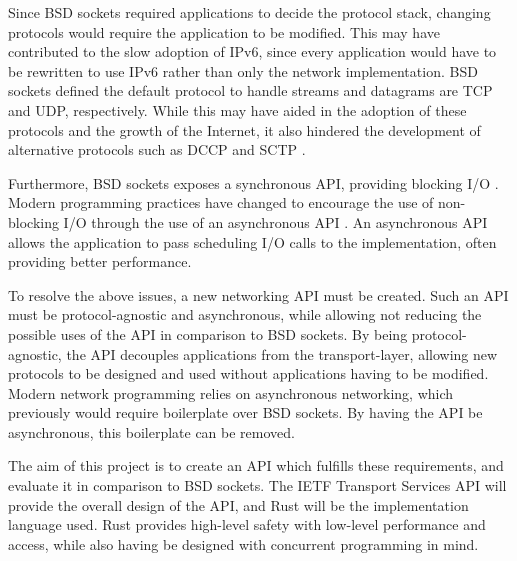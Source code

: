 \documentclass{l4proj}
\begin{document}
Since BSD sockets required applications to decide the protocol stack, changing protocols would require the application
to be modified.
This may have contributed to the slow adoption of IPv6, since every application would have to be rewritten to use IPv6
rather than only the network implementation.
BSD sockets defined the default protocol to handle streams and datagrams are TCP and UDP, respectively.
While this may have aided in the adoption of these protocols and the growth of the Internet, it also hindered the
development of alternative protocols such as DCCP and SCTP .

Furthermore, BSD sockets exposes a synchronous API, providing blocking I/O .
Modern programming practices have changed to encourage the use of non-blocking I/O through the use of an asynchronous
API .
An asynchronous API allows the application to pass scheduling I/O calls to the implementation, often providing better
performance.

To resolve the above issues, a new networking API must be created.
Such an API must be protocol-agnostic and asynchronous, while allowing not reducing the possible uses of the API in
comparison to BSD sockets.
By being protocol-agnostic, the API decouples applications from the transport-layer, allowing new protocols to be
designed and used without applications having to be modified.
Modern network programming relies on asynchronous networking, which previously would require boilerplate over BSD
sockets.
By having the API be asynchronous, this boilerplate can be removed.

The aim of this project is to create an API which fulfills these requirements, and evaluate it in comparison to BSD
sockets.
The IETF Transport Services API will provide the overall design of the API, and Rust will be the implementation language
used.
Rust provides high-level safety with low-level performance and access, while also having be designed with concurrent
programming in mind.
\end{document}
